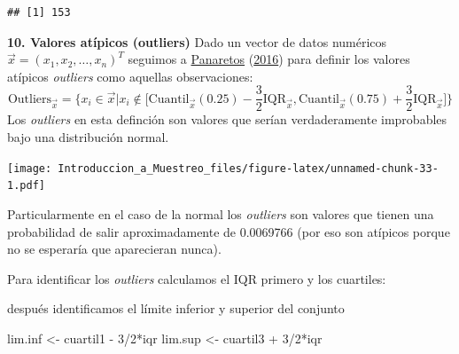 \documentclass[
]{book}
\newenvironment{Shaded}{\begin{snugshade}}{\end{snugshade}}
\newcommand{\DecValTok}[1]{\textcolor[rgb]{0.00,0.00,0.81}{#1}}
\newcommand{\FloatTok}[1]{\textcolor[rgb]{0.00,0.00,0.81}{#1}}
\newcommand{\FunctionTok}[1]{\textcolor[rgb]{0.00,0.00,0.00}{#1}}
\newcommand{\NormalTok}[1]{#1}
\newcommand{\OtherTok}[1]{\textcolor[rgb]{0.56,0.35,0.01}{#1}}
\newcommand{\SpecialCharTok}[1]{\textcolor[rgb]{0.00,0.00,0.00}{#1}}
\begin{document}
\begin{Shaded}
\end{Shaded}

\begin{verbatim}
## [1] 153
\end{verbatim}

\textbf{10. Valores atípicos (outliers)} Dado un vector de datos numéricos \(\vec{x} = (x_1, x_2, \dots, x_n)^T\) seguimos a \protect\hyperlink{ref-panaretos2016statistics}{Panaretos} (\protect\hyperlink{ref-panaretos2016statistics}{2016}) para definir los valores atípicos \emph{outliers} como aquellas observaciones:
\[
\textrm{Outliers}_{\vec{x}} = \Big\{ x_i \in \vec{x} \big| x_i \not\in \big[ \text{Cuantil}_{\vec{x}}(0.25) - \frac{3}{2} \text{IQR}_{\vec{x}}, \text{Cuantil}_{\vec{x}}(0.75) + \frac{3}{2} \text{IQR}_{\vec{x}}\big] \Big\}
\]
Los \emph{outliers} en esta definción son valores que serían verdaderamente improbables bajo una distribución normal.

\texttt{[image: Introduccion\_a\_Muestreo\_files/figure-latex/unnamed-chunk-33-1.pdf]}

Particularmente en el caso de la normal los \emph{outliers} son valores que tienen una probabilidad de salir aproximadamente de 0.0069766 (por eso son atípicos porque no se esperaría que aparecieran nunca).

Para identificar los \emph{outliers} calculamos el IQR primero y los cuartiles:

\begin{Shaded}
\end{Shaded}

después identificamos el límite inferior y superior del conjunto

\begin{Shaded}
\begin{Highlighting}[]
\NormalTok{lim.inf  }\OtherTok{\textless{}{-}}\NormalTok{ cuartil1 }\SpecialCharTok{{-}} \DecValTok{3}\SpecialCharTok{/}\DecValTok{2}\SpecialCharTok{*}\NormalTok{iqr}
\NormalTok{lim.sup  }\OtherTok{\textless{}{-}}\NormalTok{ cuartil3 }\SpecialCharTok{+} \DecValTok{3}\SpecialCharTok{/}\DecValTok{2}\SpecialCharTok{*}\NormalTok{iqr}
\end{Highlighting}
\end{Shaded}
\end{document}

